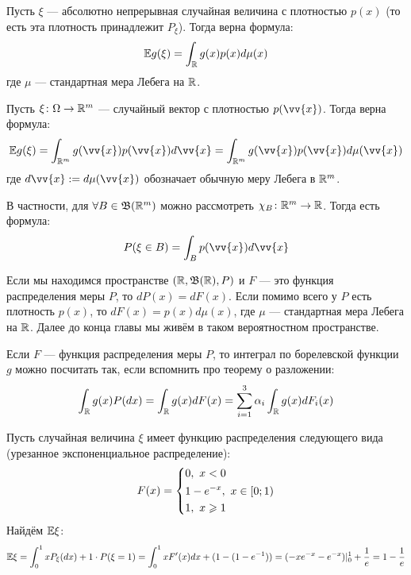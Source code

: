\begin{corollary}
	Пусть $\xi$ --- абсолютно непрерывная случайная величина с плотностью $p(x)$ (то есть эта плотность принадлежит $P_\xi$). Тогда верна формула:
	\[
		\mathbb{E} g(\xi) = \int_{\mathbb{R}} g(x)p(x)d\mu(x)
	\]
	где $\mu$ --- стандартная мера Лебега на $\mathbb{R}$.
\end{corollary}

\begin{corollary}
	Пусть $\xi \colon \Omega \to \mathbb{R}^m$ --- случайный вектор с плотностью $p(\vv{x})$. Тогда верна формула:
	\[
		\E g(\xi) = \int_{\R^m} g(\vv{x})p(\vv{x})d\vv{x} = \int_{\R^m} g(\vv{x})p(\vv{x})d\mu(\vv{x})
	\]
	где $d\vv{x} := d\mu(\vv{x})$ обозначает обычную меру Лебега в $\mathbb{R}^m$.
\end{corollary}

\begin{note}
	В частности, для $\forall B \in \mathfrak{B}(\mathbb{R}^m)$ можно рассмотреть $\chi_B \colon \mathbb{R}^m \to \mathbb{R}$. Тогда есть формула:
	\[
		P(\xi \in B) = \int_B p(\vv{x})d\vv{x}
	\]
\end{note}

\begin{note}
	Если мы находимся пространстве $(\mathbb{R}, \mathfrak{B}(\mathbb{R}), P)$ и $F$ --- это функция распределения меры $P$, то $dP(x) = dF(x)$. Если помимо всего у $P$ есть плотность $p(x)$, то $dF(x) = p(x)d\mu(x)$, где $\mu$ --- стандартная мера Лебега на $\mathbb{R}$. Далее до конца главы мы живём в таком вероятностном пространстве.
\end{note}

\begin{note}
	Если $F$ --- функция распределения меры $P$, то интеграл по борелевской функции $g$ можно посчитать так, если вспомнить про теорему о разложении:
	\[
		\int_{\mathbb{R}} g(x)P(dx) = \int_{\mathbb{R}} g(x)dF(x) = \sum_{i = 1}^3 \alpha_i \int_{\mathbb{R}} g(x)dF_i(x)
	\]
\end{note}

\begin{example}
	Пусть случайная величина $\xi$ имеет функцию распределения следующего вида (урезанное экспоненциальное распределение):
	\[
		F(x) = \left\{\begin{aligned}
			&{0,\ x < 0}
			\\
			&{1 - e^{-x},\ x \in \left[0; 1\right)}
			\\
			&{1,\ x \geqslant 1}
		\end{aligned}\right.
	\]
	Найдём $\mathbb{E}\xi$:
	\[
		\mathbb{E}\xi = \int_0^1 xP_\xi(dx) + 1 \cdot P(\xi = 1) = \int_0^1 xF'(x)dx + (1 - (1 - e^{-1})) = (-xe^{-x} - e^{-x})|_0^1 + \frac{1}{e} = 1 - \frac{1}{e}
	\]
\end{example}

